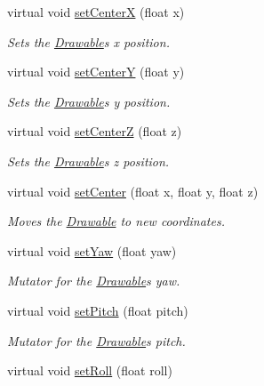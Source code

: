 \begin{DoxyCompactItemize}
virtual void \hyperlink{classtsgl_1_1_drawable_a100ed2db1357cd6bae7f991fcc353b8a}{set\+CenterX} (float x)
\begin{DoxyCompactList}\small\item\em Sets the \hyperlink{classtsgl_1_1_drawable}{Drawable}\textquotesingle{}s x position. \end{DoxyCompactList}\item 
virtual void \hyperlink{classtsgl_1_1_drawable_a389f768e42b01bf0553120c39e079a52}{set\+CenterY} (float y)
\begin{DoxyCompactList}\small\item\em Sets the \hyperlink{classtsgl_1_1_drawable}{Drawable}\textquotesingle{}s y position. \end{DoxyCompactList}\item 
virtual void \hyperlink{classtsgl_1_1_drawable_a4fe0cabf3863d81fd9889975a0580b9b}{set\+CenterZ} (float z)
\begin{DoxyCompactList}\small\item\em Sets the \hyperlink{classtsgl_1_1_drawable}{Drawable}\textquotesingle{}s z position. \end{DoxyCompactList}\item 
virtual void \hyperlink{classtsgl_1_1_drawable_aba0399448063c05ea6b01c63abf81a59}{set\+Center} (float x, float y, float z)
\begin{DoxyCompactList}\small\item\em Moves the \hyperlink{classtsgl_1_1_drawable}{Drawable} to new coordinates. \end{DoxyCompactList}\item 
virtual void \hyperlink{classtsgl_1_1_drawable_aaf7dbc52fdce998927f4459e6f235111}{set\+Yaw} (float yaw)
\begin{DoxyCompactList}\small\item\em Mutator for the \hyperlink{classtsgl_1_1_drawable}{Drawable}\textquotesingle{}s yaw. \end{DoxyCompactList}\item 
virtual void \hyperlink{classtsgl_1_1_drawable_a7857e9c90950854f76bf5967d0957367}{set\+Pitch} (float pitch)
\begin{DoxyCompactList}\small\item\em Mutator for the \hyperlink{classtsgl_1_1_drawable}{Drawable}\textquotesingle{}s pitch. \end{DoxyCompactList}\item 
virtual void \hyperlink{classtsgl_1_1_drawable_a7a99b21ab628ab11cdf5289ece1adf50}{set\+Roll} (float roll)

\end{DoxyCompactItemize}
